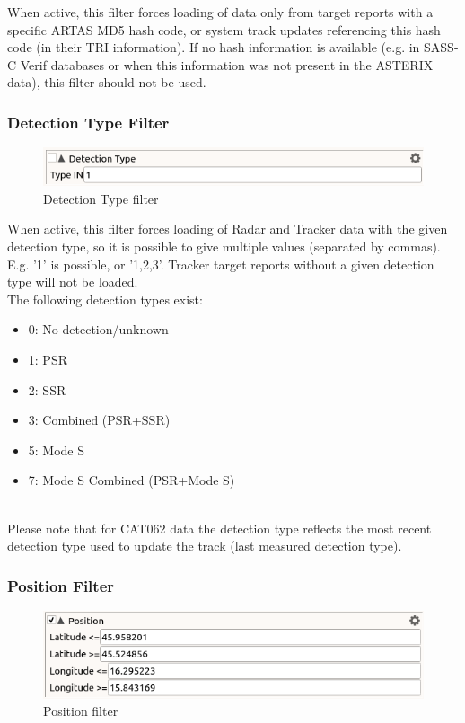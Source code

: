 When active, this filter forces loading of data only from target reports with a specific ARTAS MD5 hash code, or system track updates referencing this hash code (in their TRI information). If no hash information is available (e.g. in SASS-C Verif databases or when this information was not present in the ASTERIX data), this filter should not be used.

\subsubsection{Detection Type Filter}

\begin{figure}[H]
  \center
    \includegraphics[width=12cm,frame]{figures/filter_detection_type.png}
  \caption{Detection Type filter}
\end{figure}

When active, this filter forces loading of Radar and Tracker data with the given detection type, so it is possible to give multiple values (separated by commas). E.g. '1' is possible, or '1,2,3'. Tracker target reports without a given detection type will not be loaded. \\

The following detection types exist:
\begin{itemize}
 \item 0: No detection/unknown
 \item 1: PSR
 \item 2: SSR
 \item 3: Combined (PSR+SSR)
 \item 5: Mode S
 \item 7: Mode S Combined (PSR+Mode S)
\end{itemize}
\  \\

Please note that for CAT062 data the detection type reflects the most recent detection type used to update the track (last measured detection type).

\subsubsection{Position Filter}

\begin{figure}[H]
  \center
    \includegraphics[width=12cm,frame]{figures/filter_position.png}
  \caption{Position filter}
\end{figure}

